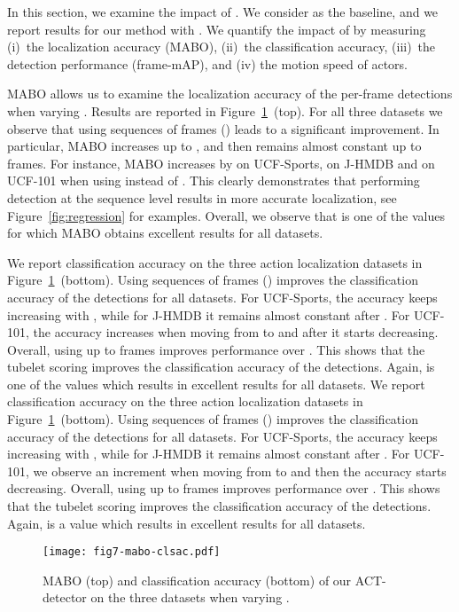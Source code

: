 \documentclass[10pt,twocolumn,letterpaper]{article}
\begin{document}
In this section, we examine the impact of . We consider  as the baseline, and we report results for our method with . We quantify the impact of  by measuring (i)~the localization accuracy (MABO), (ii)~the classification accuracy, (iii)~the detection performance (frame-mAP), and (iv) the motion speed of actors. 

MABO allows us to examine the localization accuracy of the per-frame detections when varying . Results are reported in Figure~\ref{fig:recallmabo}~(top). For all three datasets we observe that using sequences of frames () leads to a significant improvement. In particular, MABO increases up to , and then remains almost constant up to  frames. For instance, MABO increases by  on UCF-Sports,  on J-HMDB and  on UCF-101 when using  instead of . This clearly demonstrates that performing detection at the sequence level results in more accurate localization, see Figure~\ref{fig:regression} for examples. Overall, we observe that  is one of the values for which MABO obtains excellent results for all datasets. 

We report classification accuracy on the three action localization datasets in Figure~\ref{fig:recallmabo}~(bottom). Using sequences of frames () improves the classification accuracy of the detections for all datasets. 
For UCF-Sports, the accuracy keeps increasing with , while for J-HMDB it remains almost constant after . 
For UCF-101, the accuracy increases when moving from  to  and after  it starts decreasing. 
Overall, using up to  frames improves performance over . This shows that the tubelet scoring improves the classification accuracy of the detections. Again,  is one of the values which results in excellent results for all datasets. 
\ifx
We report classification accuracy on the three action localization datasets in Figure~\ref{fig:recallmabo}~(bottom). Using sequences of frames () improves the classification accuracy of the detections for all datasets. For UCF-Sports, the accuracy keeps increasing with , while for J-HMDB it remains almost constant after . For UCF-101, we observe an increment when moving from  to  and then the accuracy starts decreasing. 
Overall, using up to  frames improves performance over . This shows that the tubelet scoring improves the classification accuracy of the detections. Again,  is a value which results in excellent results for all datasets. 
\fi

\begin{figure}
\centering
\texttt{[image: fig7-mabo-clsac.pdf]} 
\vspace{-4mm}
\caption{MABO (top) and classification accuracy (bottom) of our ACT-detector on the three datasets when varying .}
\label{fig:recallmabo}
\vspace{-4mm}
\end{figure}
\end{document}
